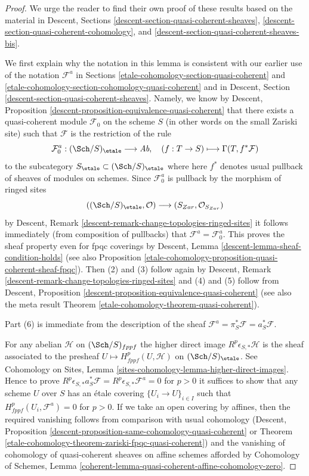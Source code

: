 \begin{proof}
We urge the reader to find their own proof of these results
based on the material in
Descent, Sections \ref{descent-section-quasi-coherent-sheaves},
\ref{descent-section-quasi-coherent-cohomology}, and
\ref{descent-section-quasi-coherent-sheaves-bis}.

\medskip\noindent
We first explain why the notation in this lemma is consistent with our
earlier use of the notation $\mathcal{F}^a$ in
Sections \ref{etale-cohomology-section-quasi-coherent} and
\ref{etale-cohomology-section-cohomology-quasi-coherent}
and in
Descent, Section \ref{descent-section-quasi-coherent-sheaves}.
Namely, we know by
Descent, Proposition \ref{descent-proposition-equivalence-quasi-coherent}
that there exists a quasi-coherent module
$\mathcal{F}_0$ on the scheme $S$ (in other words on the small
Zariski site) such that $\mathcal{F}$ is the restriction of the
rule
$$
\mathcal{F}_0^a : (\Sch/S)_\etale \longrightarrow \textit{Ab},\quad
(f : T \to S) \longmapsto \Gamma(T, f^*\mathcal{F})
$$
to the subcategory $S_\etale \subset (\Sch/S)_\etale$
where here $f^*$ denotes usual pullback of sheaves of modules on schemes.
Since $\mathcal{F}_0^a$ is pullback by the morphism of ringed
sites
$$
((\Sch/S)_\etale, \mathcal{O}) \longrightarrow (S_{Zar}, \mathcal{O}_{S_{Zar}})
$$
by Descent, Remark \ref{descent-remark-change-topologies-ringed-sites}
it follows immediately (from composition of pullbacks) that
$\mathcal{F}^a = \mathcal{F}_0^a$. This proves the sheaf property
even for fpqc coverings by
Descent, Lemma \ref{descent-lemma-sheaf-condition-holds} (see also
Proposition \ref{etale-cohomology-proposition-quasi-coherent-sheaf-fpqc}).
Then (2) and (3) follow
again by Descent, Remark \ref{descent-remark-change-topologies-ringed-sites}
and (4) and (5) follow from
Descent, Proposition \ref{descent-proposition-equivalence-quasi-coherent}
(see also the meta result
Theorem \ref{etale-cohomology-theorem-quasi-coherent}).

\medskip\noindent
Part (6) is immediate from the description of the sheaf
$\mathcal{F}^a = \pi_S^*\mathcal{F} = a_S^*\mathcal{F}$.

\medskip\noindent
For any abelian $\mathcal{H}$ on $(\Sch/S)_{fppf}$ the
higher direct image $R^p\epsilon_{S, *}\mathcal{H}$ is the sheaf
associated to the presheaf $U \mapsto H^p_{fppf}(U, \mathcal{H})$
on $(\Sch/S)_\etale$. See
Cohomology on Sites, Lemma \ref{sites-cohomology-lemma-higher-direct-images}.
Hence to prove
$R^p\epsilon_{S, *}a_S^*\mathcal{F} = R^p\epsilon_{S, *}\mathcal{F}^a = 0$
for $p > 0$ it suffices to show that any scheme $U$ over $S$
has an \'etale covering $\{U_i \to U\}_{i \in I}$ such that
$H^p_{fppf}(U_i, \mathcal{F}^a) = 0$ for $p > 0$.
If we take an open covering by affines, then the required
vanishing follows from comparison with usual cohomology
(Descent, Proposition \ref{descent-proposition-same-cohomology-quasi-coherent}
or
Theorem \ref{etale-cohomology-theorem-zariski-fpqc-quasi-coherent})
and the vanishing of cohomology of quasi-coherent sheaves
on affine schemes afforded by Cohomology of Schemes, Lemma
\ref{coherent-lemma-quasi-coherent-affine-cohomology-zero}.


\end{proof}
